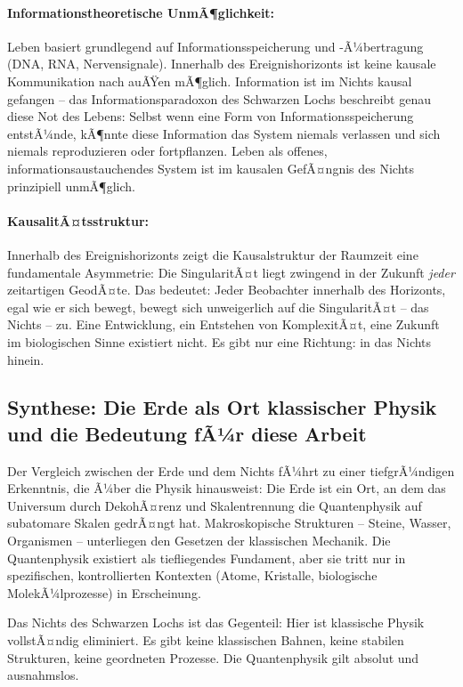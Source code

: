 ﻿\documentclass[12pt,a4paper]{report}
\begin{document}
\paragraph{Informationstheoretische UnmÃ¶glichkeit:}
Leben basiert grundlegend auf Informationsspeicherung und -Ã¼bertragung (DNA, RNA, Nervensignale). Innerhalb des Ereignishorizonts ist keine kausale Kommunikation nach auÃŸen mÃ¶glich. Information ist im Nichts kausal gefangen -- das Informationsparadoxon des Schwarzen Lochs \cite{hawking1975,bekenstein1973} beschreibt genau diese Not des Lebens: Selbst wenn eine Form von Informationsspeicherung entstÃ¼nde, kÃ¶nnte diese Information das System niemals verlassen und sich niemals reproduzieren oder fortpflanzen. Leben als offenes, informationsaustauchendes System ist im kausalen GefÃ¤ngnis des Nichts prinzipiell unmÃ¶glich.

\paragraph{KausalitÃ¤tsstruktur:}
Innerhalb des Ereignishorizonts zeigt die Kausalstruktur der Raumzeit eine fundamentale Asymmetrie: Die SingularitÃ¤t liegt zwingend in der Zukunft \emph{jeder} zeitartigen GeodÃ¤te. Das bedeutet: Jeder Beobachter innerhalb des Horizonts, egal wie er sich bewegt, bewegt sich unweigerlich auf die SingularitÃ¤t -- das Nichts -- zu. Eine Entwicklung, ein Entstehen von KomplexitÃ¤t, eine Zukunft im biologischen Sinne existiert nicht. Es gibt nur eine Richtung: in das Nichts hinein.

\subsection{Synthese: Die Erde als Ort klassischer Physik und die Bedeutung fÃ¼r diese Arbeit}

Der Vergleich zwischen der Erde und dem Nichts fÃ¼hrt zu einer tiefgrÃ¼ndigen Erkenntnis, die Ã¼ber die Physik hinausweist: Die Erde ist ein Ort, an dem das Universum durch DekohÃ¤renz und Skalentrennung die Quantenphysik auf subatomare Skalen gedrÃ¤ngt hat. Makroskopische Strukturen -- Steine, Wasser, Organismen -- unterliegen den Gesetzen der klassischen Mechanik. Die Quantenphysik existiert als tiefliegendes Fundament, aber sie tritt nur in spezifischen, kontrollierten Kontexten (Atome, Kristalle, biologische MolekÃ¼lprozesse) in Erscheinung.

Das Nichts des Schwarzen Lochs ist das Gegenteil: Hier ist klassische Physik vollstÃ¤ndig eliminiert. Es gibt keine klassischen Bahnen, keine stabilen Strukturen, keine geordneten Prozesse. Die Quantenphysik gilt absolut und ausnahmslos.
\end{document}
